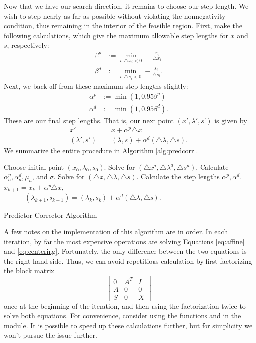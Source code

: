 Now that we have our search direction, it remains to choose our step length. We wish to step nearly as far as possible without
violating the nonnegativity condition, thus remaining in the interior of the feasible region. First, make the following
calculations, which give the maximum allowable step lengths for $x$ and $s$, respectively:
\begin{align*}
\beta^p &:= \displaystyle\min_{i : \triangle x_i < 0}-\frac{x_i}{\triangle x_i}\\
\beta^d &:= \displaystyle\min_{i : \triangle s_i < 0}-\frac{s_i}{\triangle s_i}.
\end{align*}
Next, we back off from these maximum step lengths slightly:
\begin{align*}
\alpha^p &:= \min(1, 0.95\beta^p)\\
\alpha^d &:= \min(1, 0.95\beta^d).
\end{align*}
These are our final step lengths. That is, our next point $(x', \lambda', s')$ is given by
\begin{align*}
x' &= x + \alpha^p\triangle x\\
(\lambda', s') &= (\lambda, s) + \alpha^d(\triangle \lambda, \triangle s).
\end{align*}
We summarize the entire procedure in Algorithm \ref{alg:predcorr}.
\begin{algorithm}
\begin{algorithmic}[1]
    \State \textrm{Choose initial point } $(x_0, \lambda_0, s_0)$.
        \State \textrm{Solve for } $(\triangle x^a, \triangle \lambda^a, \triangle s^a)$.
        \State \textrm{Calculate } $\alpha_a^p, \alpha_a^d, \mu_a$, \textrm{and} $\sigma$.
        \State \textrm{Solve for } $(\triangle x, \triangle \lambda, \triangle s)$.
        \State \textrm{Calculate the step lengths } $\alpha^p, \alpha^d$.
        \State $x_{k+1} = x_k + \alpha^p\triangle x$,\\
        $\qquad\quad(\lambda_{k+1}, s_{k+1}) = (\lambda_k, s_k) + \alpha^d(\triangle \lambda, \triangle s)$.
    \EndFor
\EndProcedure
\end{algorithmic}
\caption{Predictor-Corrector Algorithm}
\label{alg:predcorr}
\end{algorithm}

A few notes on the implementation of this algorithm are in order.
In each iteration, by far the most expensive operations are solving Equations \ref{eq:affine} and
\ref{eq:centering}. Fortunately, the only difference between the two equations is the right-hand side.
Thus, we can avoid repetitious calculation by first factorizing the block matrix
\[
\begin{bmatrix}
0 & A^T & I\\
A & 0 & 0\\
S & 0 & X
\end{bmatrix}
\]
once at the beginning of the iteration, and then using the factorization twice to solve both equations.
For convenience, consider using the functions  and  in the 
module. It is possible to speed up these calculations further, but for simplicity we won't pursue the issue
further.

